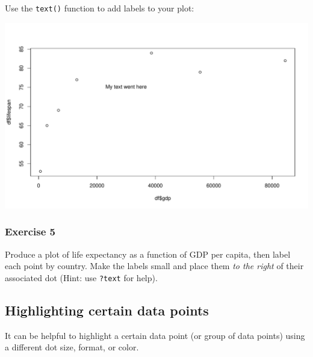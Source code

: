 \documentclass[
]{book}
\newenvironment{Shaded}{\begin{snugshade}}{\end{snugshade}}
\newcommand{\DataTypeTok}[1]{\textcolor[rgb]{0.13,0.29,0.53}{#1}}
\newcommand{\DecValTok}[1]{\textcolor[rgb]{0.00,0.00,0.81}{#1}}
\newcommand{\KeywordTok}[1]{\textcolor[rgb]{0.13,0.29,0.53}{\textbf{#1}}}
\newcommand{\NormalTok}[1]{#1}
\newcommand{\OperatorTok}[1]{\textcolor[rgb]{0.81,0.36,0.00}{\textbf{#1}}}
\newcommand{\StringTok}[1]{\textcolor[rgb]{0.31,0.60,0.02}{#1}}
\begin{document}
Use the \texttt{text()} function to add labels to your plot:

\begin{Shaded}
\end{Shaded}

\includegraphics{figures/unnamed-chunk-105-1.pdf}

\hypertarget{exercise-5-1}{%
\subsubsection*{Exercise 5}\label{exercise-5-1}}

Produce a plot of life expectancy as a function of GDP per capita, then label each point by country. Make the labels small and place them \emph{to the right} of their associated dot (Hint: use \texttt{?text} for help).

\hypertarget{highlighting-certain-data-points}{%
\subsection*{Highlighting certain data points}\label{highlighting-certain-data-points}}

It can be helpful to highlight a certain data point (or group of data points) using a different dot size, format, or color.
\end{document}
